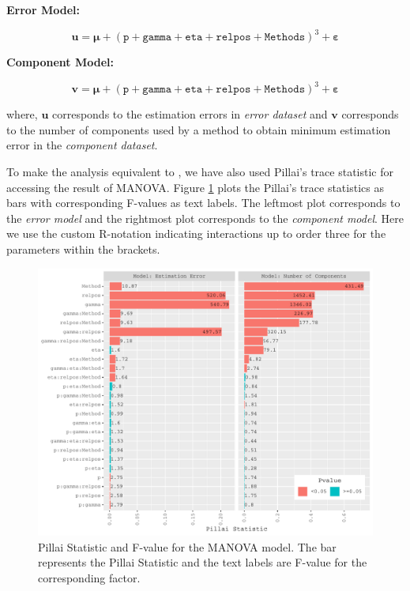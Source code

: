 \documentclass[12pt,3p,authoryear]{elsarticle}
\begin{document}
\textbf{Error Model:}

\begin{equation}
  \mathbf{u} = \boldsymbol{\mu} +
  (\texttt{p} + \texttt{gamma} + \texttt{eta} +
    \texttt{relpos} + \texttt{Methods})^3 +
    \boldsymbol{\varepsilon}
  \label{eq:err-model}
\end{equation}

\textbf{Component Model:}

\begin{equation}
  \mathbf{v} = \boldsymbol{\mu} +
  (\texttt{p} + \texttt{gamma} + \texttt{eta} +
    \texttt{relpos} + \texttt{Methods})^3 +
    \boldsymbol{\varepsilon}
  \label{eq:comp-model}
\end{equation}

where, \(\mathbf{u}\) corresponds to the estimation errors in
\emph{error dataset} and \(\mathbf{v}\) corresponds to the number of
components used by a method to obtain minimum estimation error in the
\emph{component dataset}.

To make the analysis equivalent to \citet{rimal2019pred}, we have also
used Pillai's trace statistic for accessing the result of MANOVA. Figure
\ref{fig:manova-plot} plots the Pillai's trace statistics as bars with
corresponding F-values as text labels. The leftmost plot corresponds to
the \emph{error model} and the rightmost plot corresponds to the
\emph{component model}. Here we use the custom R-notation indicating
interactions up to order three for the parameters within the brackets.





\begin{figure}[H]
\includegraphics[width=1\linewidth]{Images/pdf/manova-plot-1} \caption{Pillai Statistic and F-value for the MANOVA model. The
bar represents the Pillai Statistic and the text labels are F-value for
the corresponding factor.}\label{fig:manova-plot}
\end{figure}
\end{document}
